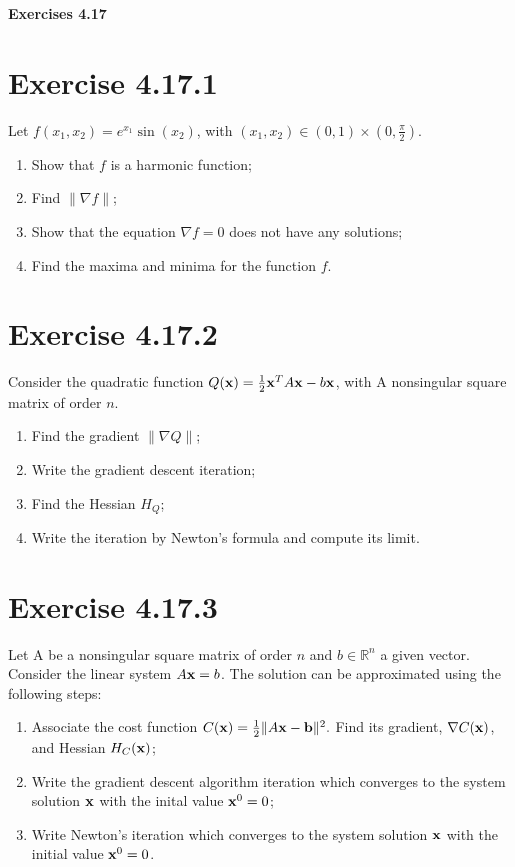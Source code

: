 \documentclass{exam}
\begin{document}
\begin{center}
    \textbf{\Large Exercises 4.17 }
\end{center}

\section*{Exercise 4.17.1}
Let $f(x_1,x_2) = e^{x_1}\sin(x_2)$, with $(x_1,x_2) \in (0,1) \times (0,\frac{\pi}{2})$.
\begin{enumerate}
    \item Show that $f$ is a harmonic function;
    \item Find $\lVert \nabla f \lVert$;
    \item Show that the equation $\nabla f = 0$ does not have any solutions;
    \item Find the maxima and minima for the function $f$.
\end{enumerate}

\section*{Exercise 4.17.2}
Consider the quadratic function $Q(\bold{x}) = \frac{1}{2} \bold{x}^{T} A \bold{x} - b \bold{x}$, with A nonsingular square matrix of order $n$.
\begin{enumerate}
    \item Find the gradient $\lVert \nabla Q \lVert$;
    \item Write the gradient descent iteration;
    \item Find the Hessian $H_{Q}$;
    \item Write the iteration by Newton's formula and compute its limit.
\end{enumerate}

\section*{Exercise 4.17.3}
Let A be a nonsingular square matrix of order $n$ and $b \in \mathbb{R}^{n}$ a given vector. Consider the linear system $A\bold{x} = b$. The solution can be approximated using 
the following steps:\\
\begin{enumerate}
    \item Associate the cost function $C(\bold{x}) = \frac{1}{2} \lVert A \bold{x} - \bold{b} \lVert^{2}.$ Find its gradient, $\nabla C(\bold{x})$,
    and Hessian $H_{C}(\bold{x})$;
    \item Write the gradient descent algorithm iteration which converges to the system solution $\bold{x}$ with the inital value $\bold{x}^{0} = 0$;
    \item Write Newton's iteration which converges to the system solution $\bold{x}$ with the initial value $\bold{x}^{0} = 0$.
\end{enumerate}
\end{document}
